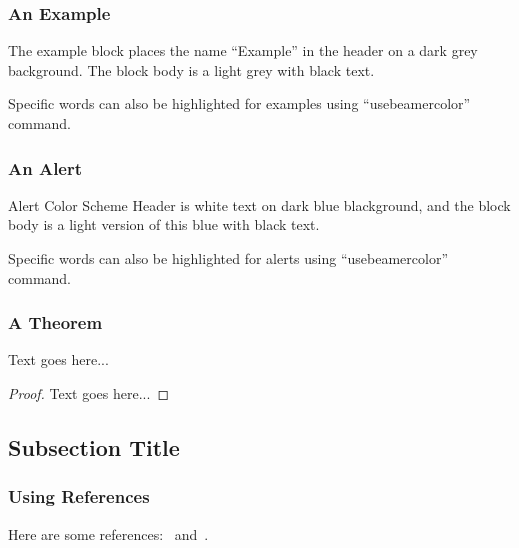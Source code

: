 \documentclass{beamer}
\begin{document}
\begin{frame}
	\frametitle{An Example}
	\begin{example}
		The example block places the name ``Example'' in the header on a dark grey
		background.  The block body is a light grey with black text.
	\end{example}
	
	{ Specific words} can also be highlighted for 
	examples using ``usebeamercolor'' command.
\end{frame}

\begin{frame}
	\frametitle{An Alert}
	\begin{alertblock}{Alert Color Scheme}
		Header is white text on dark blue blackground, and the block body is a light
		version of this blue with black text.
	\end{alertblock}
	
	{ Specific words} can also be highlighted for 
	alerts using ``usebeamercolor'' command.
\end{frame}

\begin{frame}
	\frametitle{A Theorem}
	\begin{theorem}
		Text goes here...
	\end{theorem}
	
	\begin{proof}
		Text goes here...
	\end{proof}
\end{frame}


\subsection{Subsection Title}
\begin{frame}
  \frametitle{Using References}
  
  Here are some references:~\cite{Example1ref} and~\cite{Example2ref}.
\end{frame}

 
 

%
%
%
\appendix
\end{document}
